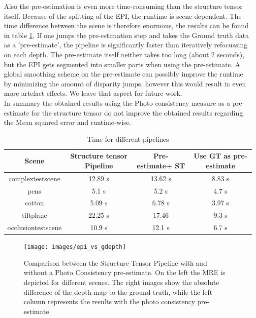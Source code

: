 \documentclass  [
  paper    = a4,
  BCOR     = 10mm,
  twoside,
  fontsize = 12pt,
  fleqn,
  toc      = bibnumbered,
  toc      = listofnumbered,
  numbers  = noendperiod,
  headings = normal,
  listof   = leveldown,
  version  = 3.03
]                                       {scrreprt}
\begin{document}
 	Also the pre-estimation is even more time-consuming than the structure tensor itself. Because of the splitting of the EPI, the runtime is scene dependent. The time difference between the scene is therefore enormous, the results can be found in table \ref{tab:time_gdepth}. If one jumps the pre-estimation step and takes the Ground truth data as a 'pre-estimate', the pipeline is significantly faster than iteratively refocussing on each depth. The pre-estimate itself neither takes too long (about 2 seconds), but the EPI gets segmented into smaller parts when using the pre-estimate. A global smoothing scheme on the pre-estimate can possibly improve the runtime by minimizing the amount of disparity jumps, however this would result in even more artefact effects. We leave that aspect for future work.\\ In summary the obtained results using the Photo consistency measure as a pre-estimate for the structure tensor do not improve the obtained results regarding the Mean squared error and runtime-wise. 
 	\begin{table}
	\begin{tabular}{|c|c|c|c|}
		\hline 
		Scene & Structure tensor Pipeline & Pre-estimate+ ST & Use GT as pre-estimate \\ 
		\hline 
		complextestscene & 12.89 s & 13.62 s & 8.83 s \\ 
		\hline 
		pens & 5.1 s & 5.2 s & 4.7 s \\ 
		\hline 
		cotton & 5.09 s & 6.78 s & 3.97 s \\ 
		\hline 
		tiltplane & 22.25 s & 17.46 &  9.3 s \\ 
		\hline 
		occlusiontestscene & 10.9 s & 12.1 s & 6.7 s \\ 
		\hline 
		
	\end{tabular} 
\label{tab:time_gdepth}
\caption[Time]{Time for different pipelines}
 	\end{table}

 	
 	
 	
 	\begin{figure}
 		\centering
 		\texttt{[image: images/epi\_vs\_gdepth]}
 		\caption[Photo-consistency Pre-estimate for the structure tensor]{Comparison between the Structure Tensor Pipeline with and without a Photo Consistency pre-estimate. On the left the MRE is depicted for different scenes. The right images show the absolute difference of the depth map to the ground truth, while the left column represents the results with the photo consistency pre-estimate}
 		\label{fig:epivsgdepth}
 	\end{figure}
 	
\end{document}

